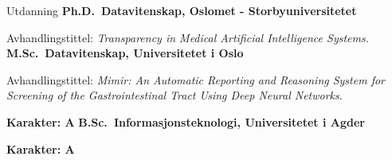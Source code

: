 \begin{rubric}{Utdanning}
\entry*[2018 -- 2022]%
\textbf{Ph.D.~Datavitenskap, Oslomet - Storbyuniversitetet}
\par Avhandlingstittel: \emph{Transparency in Medical Artificial Intelligence Systems.}
%
\entry*[2016 -- 2018]%
\textbf{M.Sc.~Datavitenskap, Universitetet i Oslo} \par
Avhandlingstittel: \emph{Mimir: An Automatic Reporting and Reasoning System for Screening of the Gastrointestinal Tract Using Deep Neural Networks}. \par
\textbf{Karakter: A}
%
\entry*[2012 -- 2015]%
\textbf{B.Sc.~Informasjonsteknologi, Universitetet i Agder} \par
\textbf{Karakter: A}
\end{rubric}